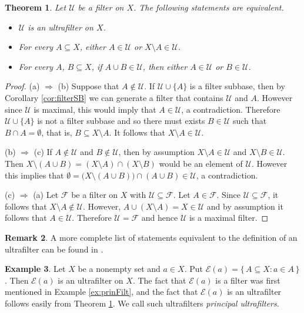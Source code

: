 \documentclass[12pt]{article}
\theoremstyle{plain}
\newtheorem{thm}{Theorem}[section]
\theoremstyle{definition}
\newtheorem{rmk}[thm]{Remark}
\newtheorem{example}[thm]{Example}
\newcommand{\calE}{\mathcal{E}}
\newcommand{\calF}{\mathcal{F}}
\newcommand{\calU}{\mathcal{U}}
\begin{document}
\begin{thm}
  \label{thm:equf}
  Let $\calU$ be a filter on $X$.
  The following statements are equivalent.
  \begin{itemize}
    \item[(a)] $\calU$ is an ultrafilter on $X$.
    \item[(b)] For every $A \subseteq X$, either $A \in \calU$ or $X
      \setminus A \in \calU$.
    \item[(c)] For every $A$, $B \subseteq X$, if $A \cup B \in
      \calU$, then either $A \in \calU$ or $B \in \calU$.
  \end{itemize}
\end{thm}
\begin{proof}
  (a) $\Rightarrow$ (b)
  Suppose that $A \not\in \calU$.
  If $\calU \cup \{A\}$ is a filter subbase, then by Corollary
  \ref{cor:filterSB} we can generate a filter that contains $\calU$
  and $A$.
  However since $\calU$ is maximal, this would imply that $A \in
  \calU$, a contradiction.
  Therefore $\calU \cup \{A\}$ is not a filter subbase and so there
  must exists $B \in \calU$ such that $B \cap A = \emptyset$, that is,
  $B \subseteq X \setminus A$.
  It follows that $X \setminus A \in \calU$.
  
  (b) $\Rightarrow$ (c)
  If $A \not\in \calU$ and $B \not\in \calU$, then by assumption $X
  \setminus A \in \calU$ and $X \setminus B \in \calU$.
  Then $X \setminus (A \cup B) = (X \setminus A) \cap (X \setminus B)$
  would be an element of $\calU$.
  However this implies that $\emptyset = \bigl(X \setminus (A \cup
  B)\bigr) \cap (A \cup B) \in \calU$, a contradiction.

  (c) $\Rightarrow$ (a)
  Let $\calF$ be a filter on $X$ with $\calU \subseteq \calF$.
  Let $A \in \calF$.
  Since $\calU \subseteq \calF$, it follows that $X \setminus A
  \not\in \calU$.
  However, $A \cup (X \setminus A) = X \in \calU$ and by assumption it
  follows that $A \in \calU$.
  Therefore $\calU = \calF$ and hence $\calU$ is a maximal filter.
\end{proof}
\begin{rmk}
  A more complete list of statements equivalent to the definition of
  an ultrafilter can be found in \cite[Theorem 3.6]{Hindman:1998fk}.
\end{rmk}

\begin{example}
  Let $X$ be a nonempty set and $a \in X$.
  Put $\calE(a) = \{\, A \subseteq X : a \in A \,\}$.
  Then $\calE(a)$ is an ultrafilter on $X$.
  The fact that $\calE(a)$ is a filter was first mentioned in Example
  \ref{ex:prinFilt}, and the fact that $\calE(a)$ is an ultrafilter
  follows easily from Theorem \ref{thm:equf}.
  We call such ultrafilters \textsl{principal ultrafilters}.
\end{example}
\end{document}
